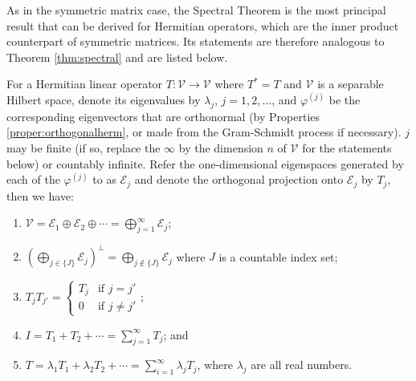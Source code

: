 As in the symmetric matrix case, the Spectral Theorem is the most principal result that can be derived for Hermitian operators, which are the inner product counterpart of symmetric matrices. Its statements are therefore analogous to Theorem \ref{thm:spectral} and are listed below.
\begin{thm}
\label{thm:spectralinner}
For a Hermitian linear operator $T: \mathcal{V} \to \mathcal{V}$ where $T^* = T$ and $\mathcal{V}$ is a separable Hilbert space, denote its eigenvalues by $\lambda_j$, $j = 1,2,\ldots$, and $\varphi^{(j)}$ be the corresponding eigenvectors that are orthonormal (by Properties \ref{proper:orthogonalherm}, or made from the Gram-Schmidt process if necessary). $j$ may be finite (if so, replace the $\infty$ by the dimension $n$ of $\mathcal{V}$ for the statements below) or countably infinite. Refer the one-dimensional eigenspaces generated by each of the $\varphi^{(j)}$ to as $\mathcal{E}_{j}$ and denote the orthogonal projection onto $\mathcal{E}_{j}$ by $T_{j}$, then we have:
\begin{enumerate}[label=(\alph*)]
\item $\mathcal{V} = \mathcal{E}_{1} \oplus \mathcal{E}_{2} \oplus \cdots  = \bigoplus_{j=1}^{\infty} \mathcal{E}_{j}$;
\item $(\bigoplus_{j \in \{J\}} \mathcal{E}_{j})^\perp = \bigoplus_{j \notin \{J\}} \mathcal{E}_{j}$ where $J$ is a countable index set;
\item $T_{j} T_{j'} = 
\begin{cases}
T_{j} & \text{if $j = j'$} \\
0 & \text{if $j \neq j'$}
\end{cases}$;
\item $I = T_{1} + T_{2} + \cdots  = \sum_{j=1}^{\infty} T_{j}$; and
\item $T = \lambda_{1}T_{1} + \lambda_{2}T_{2} + \cdots = \sum_{i=1}^{\infty} \lambda_{j}T_{j}$, where $\lambda_j$ are all real numbers.
\end{enumerate}
\end{thm}
